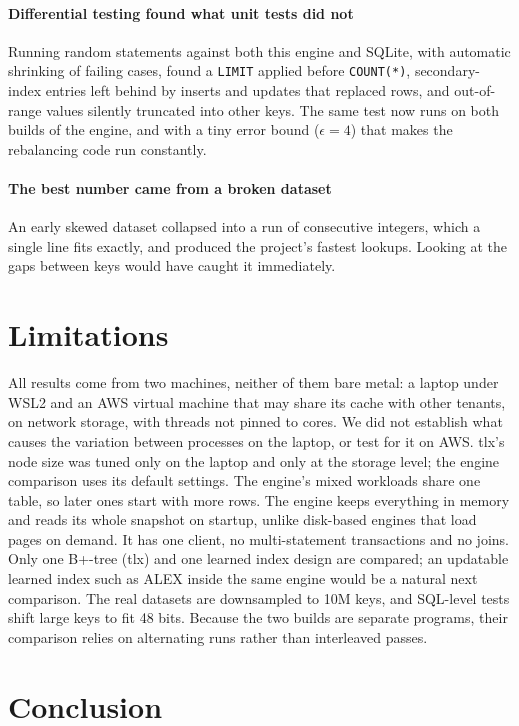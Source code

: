 \documentclass[conference]{IEEEtran}
\begin{document}
\paragraph{Differential testing found what unit tests did not} Running
random statements against both this engine and SQLite, with automatic
shrinking of failing cases, found a \texttt{LIMIT} applied before
\texttt{COUNT(*)}, secondary-index entries left behind by inserts and
updates that replaced rows, and out-of-range values silently truncated into
other keys. The same test now runs on both builds of the engine, and with a
tiny error bound ($\epsilon = 4$) that makes the rebalancing code run
constantly.

\paragraph{The best number came from a broken dataset} An early skewed
dataset collapsed into a run of consecutive integers, which a single line
fits exactly, and produced the project's fastest lookups. Looking at the
gaps between keys would have caught it immediately.

\section{Limitations}
\label{sec:limits}

All results come from two machines, neither of them bare metal: a laptop under
WSL2 and an AWS virtual machine that may share its cache with other tenants, on
network storage, with threads not pinned to cores. We did not establish what
causes the variation between processes on the laptop, or test for it on AWS. tlx's
node size was tuned only on the laptop and only at the storage level; the engine
comparison uses its default settings. The engine's mixed workloads share one
table, so later ones start with more rows. The engine keeps everything in memory
and reads its whole snapshot on startup, unlike disk-based engines that load pages on demand. It has one
client, no multi-statement transactions and no joins. Only one B+-tree
(tlx) and one learned index design are compared; an updatable learned index
such as ALEX inside the same engine would be a natural next comparison. The
real datasets are downsampled to 10M keys, and SQL-level tests shift large
keys to fit 48 bits. Because the two builds are separate programs, their
comparison relies on alternating runs rather than interleaved passes.

\section{Conclusion}
\end{document}
